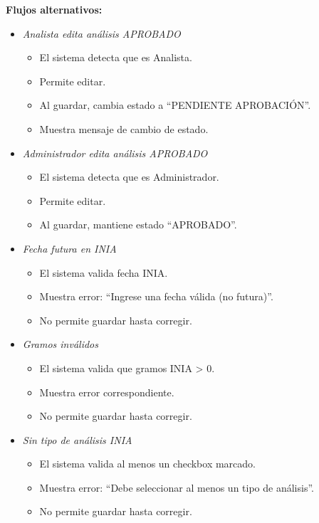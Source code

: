 \vspace{0.5em}
\noindent\textbf{Flujos alternativos:}
\begin{itemize}[nosep]
    \item \textit{Analista edita análisis APROBADO}
    \begin{itemize}[nosep]
        \item El sistema detecta que es Analista.
        \item Permite editar.
        \item Al guardar, cambia estado a ``PENDIENTE APROBACIÓN''.
        \item Muestra mensaje de cambio de estado.
    \end{itemize}

    \item \textit{Administrador edita análisis APROBADO}
    \begin{itemize}[nosep]
        \item El sistema detecta que es Administrador.
        \item Permite editar.
        \item Al guardar, mantiene estado ``APROBADO''.
    \end{itemize}

    \item \textit{Fecha futura en INIA}
    \begin{itemize}[nosep]
        \item El sistema valida fecha INIA.
        \item Muestra error: ``Ingrese una fecha válida (no futura)''.
        \item No permite guardar hasta corregir.
    \end{itemize}

    \item \textit{Gramos inválidos}
    \begin{itemize}[nosep]
        \item El sistema valida que gramos INIA > 0.
        \item Muestra error correspondiente.
        \item No permite guardar hasta corregir.
    \end{itemize}

    \item \textit{Sin tipo de análisis INIA}
    \begin{itemize}[nosep]
        \item El sistema valida al menos un checkbox marcado.
        \item Muestra error: ``Debe seleccionar al menos un tipo de análisis''.
        \item No permite guardar hasta corregir.
    \end{itemize}


\end{itemize}
